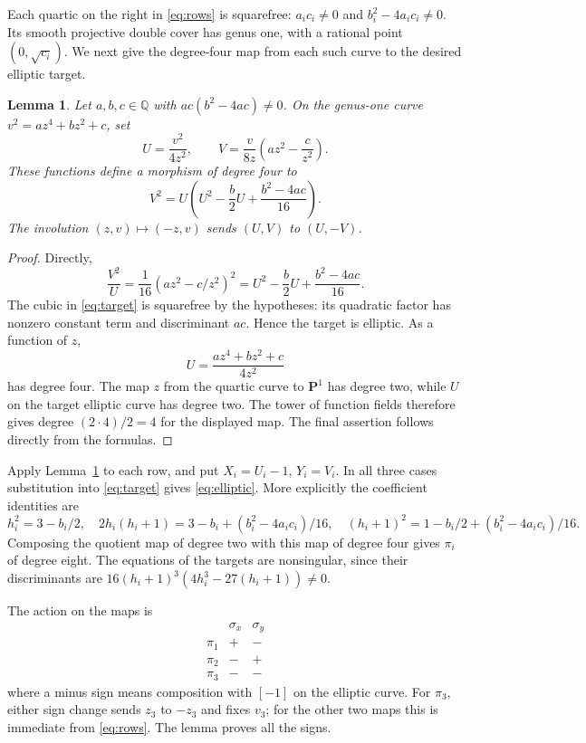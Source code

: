\documentclass[11pt,reqno]{amsart}
\newtheorem{lemma}[theorem]{Lemma}
\theoremstyle{remark}
\newcommand{\Q}{\mathbb Q}
\begin{document}
Each quartic on the right in \eqref{eq:rows} is squarefree:
\(a_ic_i\ne0\) and \(b_i^2-4a_ic_i\ne0\).
Its smooth projective double cover has genus one, with a rational
point \((0,\sqrt{c_i})\). We next give the degree-four map from
each such curve to the desired elliptic target.

\begin{lemma}\label{lem:quartic}
Let \(a,b,c\in\Q\) with \(ac(b^2-4ac)\ne0\).
On the genus-one curve \(v^2=az^4+bz^2+c\), set
\begin{equation}\label{eq:quartic-map}
 U=\frac{v^2}{4z^2},\qquad
 V=\frac{v}{8z}\left(az^2-\frac{c}{z^2}\right).
\end{equation}
These functions define a morphism of degree four to
\begin{equation}\label{eq:target}
 V^2=U\left(U^2-\frac b2U+\frac{b^2-4ac}{16}\right).
\end{equation}
The involution \((z,v)\mapsto(-z,v)\) sends \((U,V)\) to \((U,-V)\).
\end{lemma}
\begin{proof}
Directly,
\[
 \frac{V^2}{U}=\frac1{16}(az^2-c/z^2)^2
             =U^2-\frac b2U+\frac{b^2-4ac}{16}.
\]
The cubic in \eqref{eq:target} is squarefree by the hypotheses:
its quadratic factor has nonzero constant term and discriminant
\(ac\). Hence the target is elliptic. As a function of \(z\),
\[
 U=\frac{az^4+bz^2+c}{4z^2}
\]
has degree four. The map \(z\) from the quartic curve to
\(\mathbf P^1\) has degree two, while \(U\) on the target elliptic
curve has degree two. The tower of function fields therefore gives
degree \((2\cdot4)/2=4\) for the displayed map.
The final assertion follows directly from the formulas.
\end{proof}

Apply Lemma~\ref{lem:quartic} to each row, and put
\(X_i=U_i-1\), \(Y_i=V_i\).
In all three cases substitution into \eqref{eq:target} gives
\eqref{eq:elliptic}. More explicitly the coefficient identities are
\[
 h_i^2=3-b_i/2,\quad
 2h_i(h_i+1)=3-b_i+(b_i^2-4a_ic_i)/16,
 \quad
 (h_i+1)^2=1-b_i/2+(b_i^2-4a_ic_i)/16.
\]
Composing the quotient map of degree two with this map of degree
four gives \(\pi_i\) of degree eight. The equations of the targets
are nonsingular, since their discriminants are
\(16(h_i+1)^3(4h_i^3-27(h_i+1))\ne0\).

The action on the maps is
\begin{equation}\label{eq:characters}
\begin{array}{c|rr}
 &\sigma_x&\sigma_y\\ \hline
 \pi_1&+&-\\
 \pi_2&-&+\\
 \pi_3&-&-
\end{array}
\end{equation}
where a minus sign means composition with \([-1]\) on the elliptic
curve. For \(\pi_3\), either sign change sends \(z_3\) to
\(-z_3\) and fixes \(v_3\); for the other two maps this is immediate
from \eqref{eq:rows}. The lemma proves all the signs.
\end{document}

